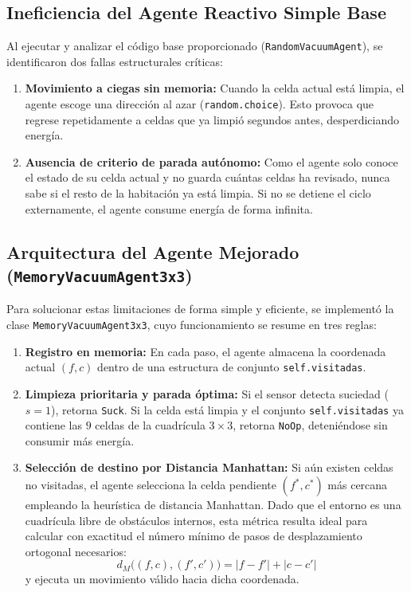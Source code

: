 \documentclass[runningheads]{llncs}
\begin{document}
\subsection{Ineficiencia del Agente Reactivo Simple Base}
Al ejecutar y analizar el código base proporcionado (\texttt{RandomVacuumAgent}), se identificaron dos fallas estructurales críticas:
\begin{enumerate}
    \item \textbf{Movimiento a ciegas sin memoria:} Cuando la celda actual está limpia, el agente escoge una dirección al azar (\texttt{random.choice}). Esto provoca que regrese repetidamente a celdas que ya limpió segundos antes, desperdiciando energía.
    \item \textbf{Ausencia de criterio de parada autónomo:} Como el agente solo conoce el estado de su celda actual y no guarda cuántas celdas ha revisado, nunca sabe si el resto de la habitación ya está limpia. Si no se detiene el ciclo externamente, el agente consume energía de forma infinita.
\end{enumerate}

\subsection{Arquitectura del Agente Mejorado (\texttt{MemoryVacuumAgent3x3})}
Para solucionar estas limitaciones de forma simple y eficiente, se implementó la clase \texttt{MemoryVacuumAgent3x3}, cuyo funcionamiento se resume en tres reglas:
\begin{enumerate}
    \item \textbf{Registro en memoria:} En cada paso, el agente almacena la coordenada actual $(f, c)$ dentro de una estructura de conjunto \texttt{self.visitadas}.
    \item \textbf{Limpieza prioritaria y parada óptima:} Si el sensor detecta suciedad ($s = 1$), retorna \texttt{Suck}. Si la celda está limpia y el conjunto \texttt{self.visitadas} ya contiene las $9$ celdas de la cuadrícula $3\times 3$, retorna \texttt{NoOp}, deteniéndose sin consumir más energía.
    \item \textbf{Selección de destino por Distancia Manhattan:} Si aún existen celdas no visitadas, el agente selecciona la celda pendiente $(f^*, c^*)$ más cercana empleando la heurística de distancia Manhattan. Dado que el entorno es una cuadrícula libre de obstáculos internos, esta métrica resulta ideal para calcular con exactitud el número mínimo de pasos de desplazamiento ortogonal necesarios:
    \begin{equation}
        d_M\big((f, c), (f', c')\big) = |f - f'| + |c - c'|
    \end{equation}
    y ejecuta un movimiento válido hacia dicha coordenada.
\end{enumerate}
\end{document}
